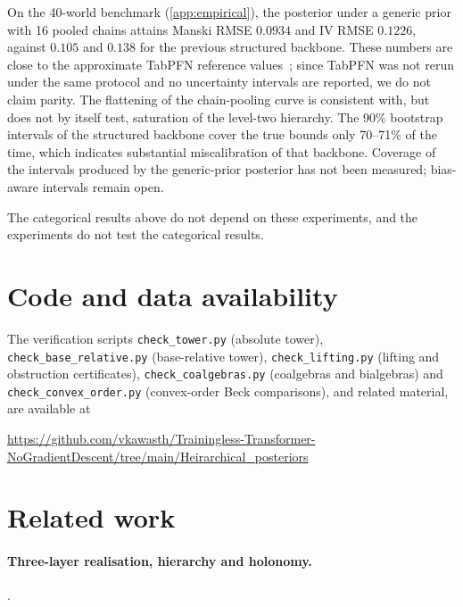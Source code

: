 \documentclass[11pt]{article}
\theoremstyle{definition}
\theoremstyle{remark}
\begin{document}
On the 40-world benchmark (\cref{app:empirical}), the posterior under a generic prior with 16 pooled
chains attains Manski RMSE $0.0934$ and IV RMSE $0.1226$, against $0.105$ and $0.138$ for the
previous structured backbone. These numbers are close to the approximate TabPFN reference
values~\cite{Hollmann2023}; since TabPFN was not rerun under the same protocol and no uncertainty
intervals are reported, we do not claim parity. The flattening of the chain-pooling curve is
consistent with, but does not by itself test, saturation of the level-two hierarchy. The 90\%
bootstrap intervals of the structured backbone cover the true bounds only 70--71\% of the time, which
indicates substantial miscalibration of that backbone. Coverage of the intervals produced by the
generic-prior posterior has not been measured; bias-aware intervals remain open.

The categorical results above do not depend on these experiments, and the experiments do not test
the categorical results.

\section{Code and data availability}

The verification scripts \texttt{check\_tower.py} (absolute tower),
\texttt{check\_base\_relative.py} (base-relative tower), \texttt{check\_lifting.py} (lifting and
obstruction certificates), \texttt{check\_coalgebras.py} (coalgebras and bialgebras) and
\texttt{check\_convex\_order.py} (convex-order Beck comparisons), and related material, are available
at
\begin{center}\small\url{https://github.com/vkawasth/Trainingless-Transformer-NoGradientDescent/tree/main/Heirarchical_posteriors}\end{center}

\section{Related work}

\paragraph{Three-layer realisation, hierarchy and holonomy.}
\cite{Awasthi-ThreeLayers,Awasthi-Hierarchy,Awasthi-Holonomy}.
\end{document}
